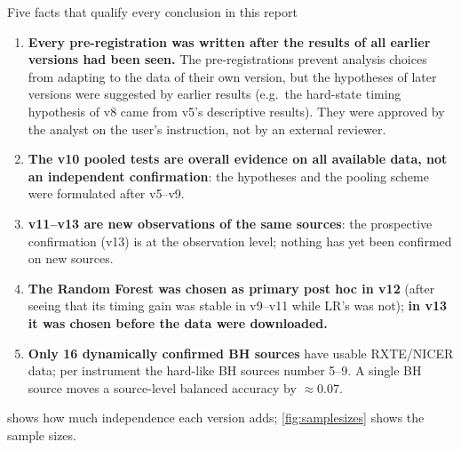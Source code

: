 \begin{cautionbox}{Five facts that qualify every conclusion in this report}
\begin{enumerate}[leftmargin=1.4em]
\item \textbf{Every pre-registration was written after the results of all earlier versions had been seen.} The
pre-registrations prevent analysis choices from adapting to the data of their own version, but the hypotheses of later
versions were suggested by earlier results (e.g.\ the hard-state timing hypothesis of v8 came from v5's descriptive
results). They were approved by the analyst on the user's instruction, not by an external reviewer.
\item \textbf{The v10 pooled tests are overall evidence on all available data, not an independent confirmation}: the
hypotheses and the pooling scheme were formulated after v5--v9.
\item \textbf{v11--v13 are new observations of the same sources}: the prospective confirmation (v13) is at the
observation level; nothing has yet been confirmed on new sources.
\item \textbf{The Random Forest was chosen as primary post hoc in v12} (after seeing that its timing gain was stable in
v9--v11 while LR's was not); \textbf{in v13 it was chosen before the data were downloaded.}
\item \textbf{Only 16 dynamically confirmed BH sources} have usable RXTE/NICER data; per instrument the hard-like BH
sources number 5--9. A single BH source moves a source-level balanced accuracy by $\approx0.07$.
\end{enumerate}
\end{cautionbox}

 shows how much independence each version adds; \cref{fig:samplesizes} shows the sample sizes.

